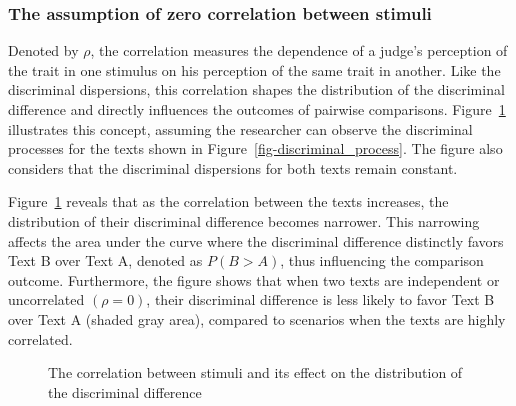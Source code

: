 \documentclass[
  authoryear,
  preprint,
  1p]{elsarticle}
\begin{document}
\subsubsection{The assumption of zero correlation between
stimuli}\label{sec-theory-issue1b}

Denoted by \(\rho\), the correlation measures the dependence of a
judge's perception of the trait in one stimulus on his perception of the
same trait in another. Like the discriminal dispersions, this
correlation shapes the distribution of the discriminal difference and
directly influences the outcomes of pairwise comparisons.
Figure~\ref{fig-correlation} illustrates this concept, assuming the
researcher can observe the discriminal processes for the texts shown in
Figure~\ref{fig-discriminal_process}. The figure also considers that the
discriminal dispersions for both texts remain constant.

Figure~\ref{fig-correlation} reveals that as the correlation between the
texts increases, the distribution of their discriminal difference
becomes narrower. This narrowing affects the area under the curve where
the discriminal difference distinctly favors Text B over Text A, denoted
as \(P(B > A)\), thus influencing the comparison outcome. Furthermore,
the figure shows that when two texts are independent or uncorrelated
\((\rho=0)\), their discriminal difference is less likely to favor Text
B over Text A (shaded gray area), compared to scenarios when the texts
are highly correlated.

\begin{figure}


\caption{\label{fig-correlation}The correlation between stimuli and its
effect on the distribution of the discriminal difference}

\end{figure}%
\end{document}
